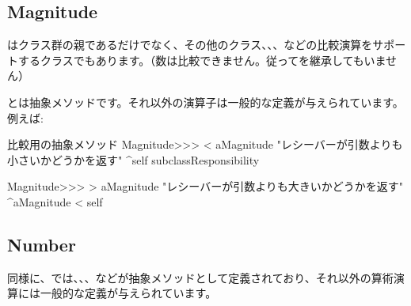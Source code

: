 \documentclass[a4paper,10pt,twoside]{book}
\begin{document}
\subsection{Magnitude}

はクラス群の親であるだけでなく、その他のクラス、、、などの比較演算をサポートするクラスでもあります。（数は比較できません。従ってを継承してもいません）

とは抽象メソッドです。それ以外の演算子は一般的な定義が与えられています。例えば:

\begin{method}{比較用の抽象メソッド}
Magnitude>>> < aMagnitude 
    "レシーバーが引数よりも小さいかどうかを返す"
    ^self subclassResponsibility

Magnitude>>> > aMagnitude 
    "レシーバーが引数よりも大きいかどうかを返す"
    ^aMagnitude < self
\end{method}

\subsection{Number}

同様に、では、、、などが抽象メソッドとして定義されており、それ以外の算術演算には一般的な定義が与えられています。
\end{document}
